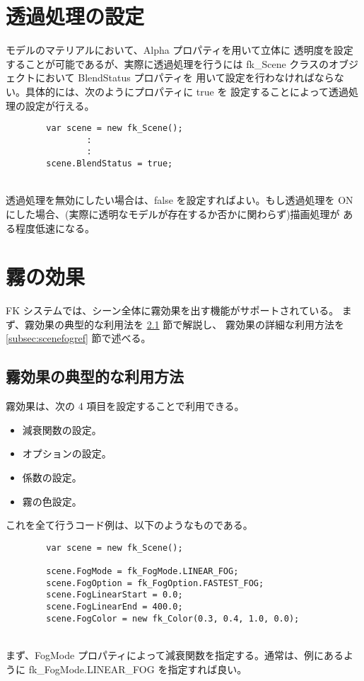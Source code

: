 \section{透過処理の設定} \label{sec:scenetrans}
モデルのマテリアルにおいて、Alpha プロパティを用いて立体に
透明度を設定することが可能であるが、実際に透過処理を行うには
fk\_Scene クラスのオブジェクトにおいて BlendStatus プロパティを
用いて設定を行わなければならない。具体的には、次のようにプロパティに true を
設定することによって透過処理の設定が行える。
\\
\begin{screen}
\begin{verbatim}
        var scene = new fk_Scene();
                :
                :
        scene.BlendStatus = true;
\end{verbatim}
\end{screen}
~ \\
透過処理を無効にしたい場合は、false を設定すればよい。もし透過処理を
ON にした場合、(実際に透明なモデルが存在するか否かに関わらず)描画処理が
ある程度低速になる。

\section{霧の効果}
FK システムでは、シーン全体に霧効果を出す機能がサポートされている。
まず、霧効果の典型的な利用法を \ref{subsec:scenefogintro} 節で解説し、
霧効果の詳細な利用方法を \ref{subsec:scenefogref} 節で述べる。

\subsection{霧効果の典型的な利用方法} \label{subsec:scenefogintro}
霧効果は、次の 4 項目を設定することで利用できる。
\begin{itemize}
 \item 減衰関数の設定。
 \item オプションの設定。
 \item 係数の設定。
 \item 霧の色設定。
\end{itemize}
これを全て行うコード例は、以下のようなものである。
\\
\begin{breakbox}
\begin{verbatim}
        var scene = new fk_Scene();

        scene.FogMode = fk_FogMode.LINEAR_FOG;
        scene.FogOption = fk_FogOption.FASTEST_FOG;
        scene.FogLinearStart = 0.0;
        scene.FogLinearEnd = 400.0;
        scene.FogColor = new fk_Color(0.3, 0.4, 1.0, 0.0);
\end{verbatim}
\end{breakbox}
~ \\
まず、FogMode プロパティによって減衰関数を指定する。通常は、例にあるように
fk\_FogMode.LINEAR\_FOG を指定すれば良い。

